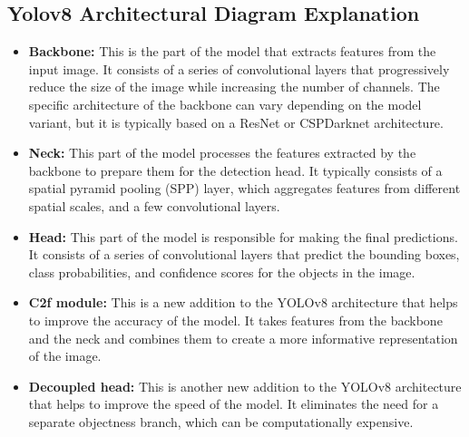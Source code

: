 \documentclass[12 pt]{report}
\begin{document}
\subsection{Yolov8 Architectural Diagram Explanation}
{
  \begin{itemize}
    \item \textbf{Backbone:} This is the part of the model that extracts features from the input image. It consists of a series of convolutional layers that progressively reduce the size of the image while increasing the number of channels. The specific architecture of the backbone can vary depending on the model variant, but it is typically based on a ResNet or CSPDarknet architecture.

    \item \textbf{Neck:} This part of the model processes the features extracted by the backbone to prepare them for the detection head. It typically consists of a spatial pyramid pooling (SPP) layer, which aggregates features from different spatial scales, and a few convolutional layers.

    \item \textbf{Head:} This part of the model is responsible for making the final predictions. It consists of a series of convolutional layers that predict the bounding boxes, class probabilities, and confidence scores for the objects in the image.

    \item \textbf{C2f module:} This is a new addition to the YOLOv8 architecture that helps to improve the accuracy of the model. It takes features from the backbone and the neck and combines them to create a more informative representation of the image.

    \item \textbf{Decoupled head:} This is another new addition to the YOLOv8 architecture that helps to improve the speed of the model. It eliminates the need for a separate objectness branch, which can be computationally expensive.
\end{itemize}
}

%
%
\end{document}
